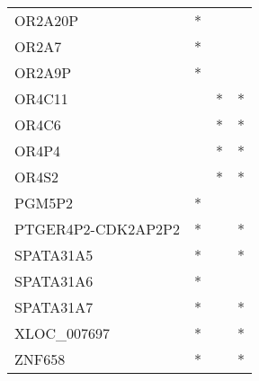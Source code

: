 \begin{longtable}{lccc}
OR2A20P            &   * &     &         \\
OR2A7              &   * &     &         \\
OR2A9P             &   * &     &         \\
OR4C11             &     &   * &       * \\
OR4C6              &     &   * &       * \\
OR4P4              &     &   * &       * \\
OR4S2              &     &   * &       * \\
PGM5P2             &   * &     &         \\
PTGER4P2-CDK2AP2P2 &   * &     &       * \\
SPATA31A5          &   * &     &       * \\
SPATA31A6          &   * &     &         \\
SPATA31A7          &   * &     &       * \\
XLOC\_007697        &   * &     &       * \\
ZNF658             &   * &     &       * \\
\end{longtable}
